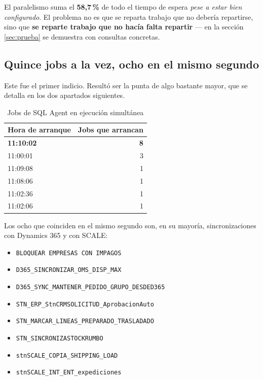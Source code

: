 \documentclass[11pt,a4paper]{article}
\newcommand{\cod}[1]{\texttt{\small #1}}
\newcommand{\critico}[1]{\textcolor{rojo}{\textbf{#1}}}
\begin{document}
El paralelismo suma el \critico{58,7\,\%} de todo el tiempo de espera
\emph{pese a estar bien configurado}. El problema no es que se reparta
trabajo que no debería repartirse, sino que \textbf{se reparte trabajo que no
hacía falta repartir} — en la sección \ref{sec:prueba} se demuestra con
consultas concretas.

\subsection{Quince jobs a la vez, ocho en el mismo segundo}

Este fue el primer indicio. Resultó ser la punta de algo bastante mayor, que
se detalla en los dos apartados siguientes.

\begin{table}[h]
\centering
\small
\begin{tabular}{lr}
\toprule
\textbf{Hora de arranque} & \textbf{Jobs que arrancan} \\
\midrule
\critico{11:10:02} & \critico{8} \\
11:00:01 & 3 \\
11:09:08 & 1 \\
11:08:06 & 1 \\
11:02:36 & 1 \\
11:02:06 & 1 \\
\bottomrule
\end{tabular}
\caption{Jobs de SQL Agent en ejecución simultánea}
\end{table}

Los ocho que coinciden en el mismo segundo son, en su mayoría,
sincronizaciones con Dynamics 365 y con SCALE:

\begin{itemize}\itemsep1pt
  \item \cod{BLOQUEAR EMPRESAS CON IMPAGOS}
  \item \cod{D365\_SINCRONIZAR\_OMS\_DISP\_MAX}
  \item \cod{D365\_SYNC\_MANTENER\_PEDIDO\_GRUPO\_DESDED365}
  \item \cod{STN\_ERP\_StnCRMSOLICITUD\_AprobacionAuto}
  \item \cod{STN\_MARCAR\_LINEAS\_PREPARADO\_TRASLADADO}
  \item \cod{STN\_SINCRONIZASTOCKRUMBO}
  \item \cod{stnSCALE\_COPIA\_SHIPPING\_LOAD}
  \item \cod{stnSCALE\_INT\_ENT\_expediciones}
\end{itemize}
\end{document}
